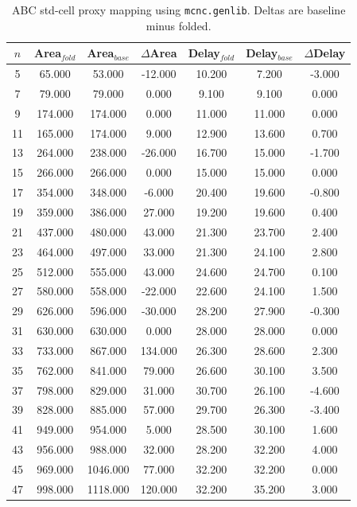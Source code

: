 \begin{table}[t]
\centering
\caption{ABC std-cell proxy mapping using \texttt{mcnc.genlib}. Deltas are baseline minus folded.}
\label{tab:stdcell_mcnc_genlib}
\begin{tabular}{ccccccc}
\hline
$n$ & Area$_{fold}$ & Area$_{base}$ & $\Delta$Area & Delay$_{fold}$ & Delay$_{base}$ & $\Delta$Delay \\
\hline
5 & 65.000 & 53.000 & -12.000 & 10.200 & 7.200 & -3.000 \\
7 & 79.000 & 79.000 & 0.000 & 9.100 & 9.100 & 0.000 \\
9 & 174.000 & 174.000 & 0.000 & 11.000 & 11.000 & 0.000 \\
11 & 165.000 & 174.000 & 9.000 & 12.900 & 13.600 & 0.700 \\
13 & 264.000 & 238.000 & -26.000 & 16.700 & 15.000 & -1.700 \\
15 & 266.000 & 266.000 & 0.000 & 15.000 & 15.000 & 0.000 \\
17 & 354.000 & 348.000 & -6.000 & 20.400 & 19.600 & -0.800 \\
19 & 359.000 & 386.000 & 27.000 & 19.200 & 19.600 & 0.400 \\
21 & 437.000 & 480.000 & 43.000 & 21.300 & 23.700 & 2.400 \\
23 & 464.000 & 497.000 & 33.000 & 21.300 & 24.100 & 2.800 \\
25 & 512.000 & 555.000 & 43.000 & 24.600 & 24.700 & 0.100 \\
27 & 580.000 & 558.000 & -22.000 & 22.600 & 24.100 & 1.500 \\
29 & 626.000 & 596.000 & -30.000 & 28.200 & 27.900 & -0.300 \\
31 & 630.000 & 630.000 & 0.000 & 28.000 & 28.000 & 0.000 \\
33 & 733.000 & 867.000 & 134.000 & 26.300 & 28.600 & 2.300 \\
35 & 762.000 & 841.000 & 79.000 & 26.600 & 30.100 & 3.500 \\
37 & 798.000 & 829.000 & 31.000 & 30.700 & 26.100 & -4.600 \\
39 & 828.000 & 885.000 & 57.000 & 29.700 & 26.300 & -3.400 \\
41 & 949.000 & 954.000 & 5.000 & 28.500 & 30.100 & 1.600 \\
43 & 956.000 & 988.000 & 32.000 & 28.200 & 32.200 & 4.000 \\
45 & 969.000 & 1046.000 & 77.000 & 32.200 & 32.200 & 0.000 \\
47 & 998.000 & 1118.000 & 120.000 & 32.200 & 35.200 & 3.000 \\

\end{tabular}
\end{table}
